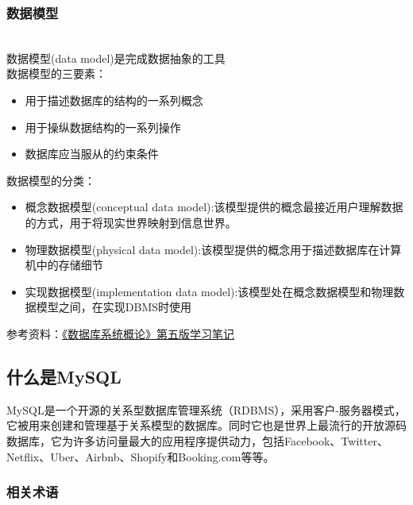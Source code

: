 \subsubsection{数据模型}\\
数据模型(data model)是完成数据抽象的工具 \\
数据模型的三要素：
\begin{itemize}
\item 用于描述数据库的结构的一系列概念
\item 用于操纵数据结构的一系列操作
\item 数据库应当服从的约束条件
\end{itemize}
数据模型的分类：
\begin{itemize}
\item 概念数据模型(conceptual data model):该模型提供的概念最接近用户理解数据的方式，用于将现实世界映射到信息世界。
\item 物理数据模型(physical data model):该模型提供的概念用于描述数据库在计算机中的存储细节
\item 实现数据模型(implementation data model):该模型处在概念数据模型和物理数据模型之间，在实现DBMS时使用
\end{itemize}

参考资料：\href{http://t.csdn.cn/SFcuR}{《数据库系统概论》第五版学习笔记}

\subsection{什么是MySQL}

MySQL是一个开源的关系型数据库管理系统（RDBMS），采用客户-服务器模式，它被用来创建和管理基于关系模型的数据库。同时它也是世界上最流行的开放源码数据库，它为许多访问量最大的应用程序提供动力，包括Facebook、Twitter、Netflix、Uber、Airbnb、Shopify和Booking.com等等。

\subsubsection{相关术语}

